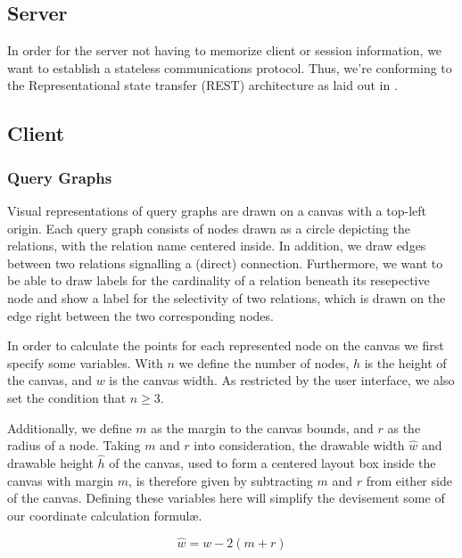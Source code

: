 \subsection{Server}

In order for the server not having to memorize client or session information, we want to establish a stateless communications protocol.
Thus, we're conforming to the Representational state transfer (REST) architecture as laid out in \cite{fielding2000architectural}.

\subsection{Client}

\subsubsection{Query Graphs}
\label{subsub:query-graphs}

Visual representations of query graphs are drawn on a canvas with a top-left origin. Each query graph consists of nodes drawn as a circle depicting the relations, with the relation name centered inside. In addition, we draw edges  between two relations signalling a (direct) connection. Furthermore, we want to be able to draw labels for the cardinality of a relation beneath its resepective node and show a label for the selectivity of two relations, which is drawn on the edge right between the two corresponding nodes.

In order to calculate the points for each represented node on the canvas we first specify some variables.
With $n$ we define the number of nodes, $h$ is the height of the canvas, and $w$ is the canvas width. 
As restricted by the user interface, we also set the condition that $n \geq 3$.

Additionally, we define $m$ as the margin to the canvas bounds, and $r$ as the radius of a node.
Taking $m$ and $r$ into consideration, the drawable width $\hat{w}$ and drawable height $\hat{h}$ of the canvas, used to form a centered layout box inside the canvas with margin $m$, is therefore given by subtracting $m$ and $r$ from either side of the canvas. Defining these variables here will simplify the devisement some of our coordinate calculation formul\ae.

\begin{equation}\label{eqn:painting-w_hat}
    \hat{w} = w - 2(m + r)
\end{equation}


